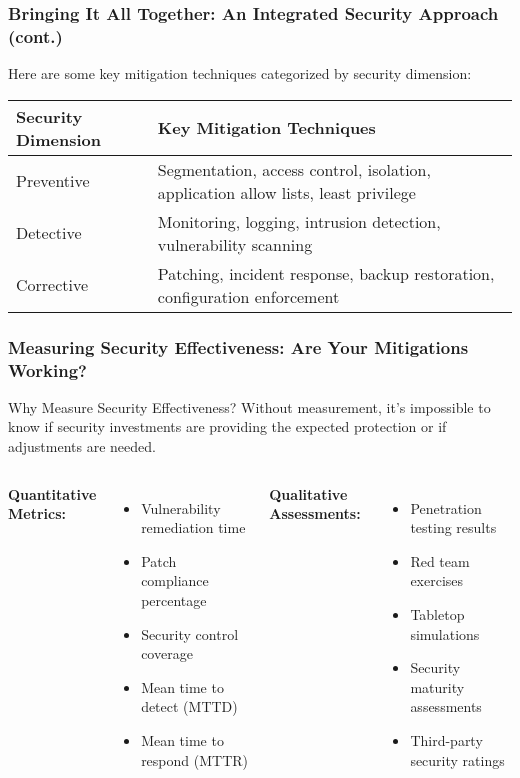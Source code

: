 \documentclass{beamer}
\begin{document}
    \begin{frame}
    \frametitle{Bringing It All Together: An Integrated Security Approach (cont.)}
    Here are some key mitigation techniques categorized by security dimension:
        \begin{table}
            \begin{tabularx}{\textwidth}{|l|X|}
            \hline
            \textbf{Security Dimension} & \textbf{Key Mitigation Techniques} \\
            \hline
            Preventive & Segmentation, access control, isolation, application allow lists, least privilege \\
            \hline
            Detective & Monitoring, logging, intrusion detection, vulnerability scanning \\
            \hline
            Corrective & Patching, incident response, backup restoration, configuration enforcement \\
            \hline
            \end{tabularx}
            \end{table}
        
    \end{frame}
    
    \begin{frame}
    \frametitle{Measuring Security Effectiveness: Are Your Mitigations Working?}
    
    \begin{block}{Why Measure Security Effectiveness?}
    Without measurement, it's impossible to know if security investments are providing the expected protection or if adjustments are needed.
    \end{block}
    
    \begin{columns}[t]
    \textbf{Quantitative Metrics:}
    \begin{itemize}
    \item Vulnerability remediation time
    \item Patch compliance percentage
    \item Security control coverage
    \item Mean time to detect (MTTD)
    \item Mean time to respond (MTTR)
    \end{itemize}
    
    \textbf{Qualitative Assessments:}
    \begin{itemize}
    \item Penetration testing results
    \item Red team exercises
    \item Tabletop simulations
    \item Security maturity assessments
    \item Third-party security ratings
    \end{itemize}
    \end{columns}
    
    \end{frame}
    
\end{document}
